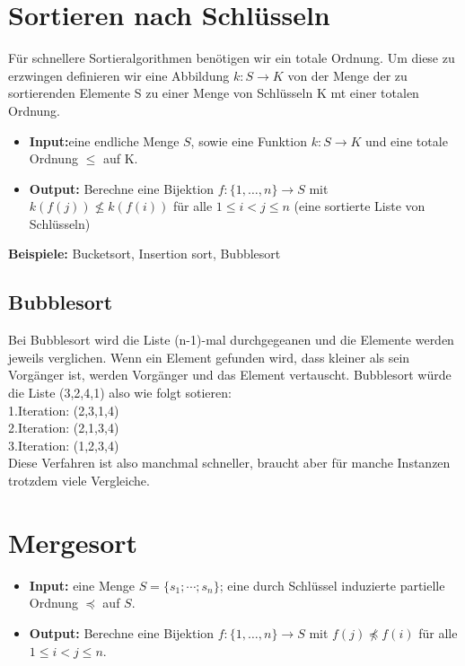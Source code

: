\documentclass{article}
\begin{document}
\section{Sortieren nach Schlüsseln}

Für schnellere Sortieralgorithmen benötigen wir ein totale Ordnung. Um diese zu erzwingen definieren wir eine Abbildung $k:S\rightarrow K$ von der Menge der zu sortierenden Elemente S zu einer Menge von Schlüsseln K mt einer totalen Ordnung.
\begin{itemize}\item\textbf{Input:}eine endliche Menge $S$, sowie eine Funktion $k:S\rightarrow K$ und eine totale Ordnung $\le$ auf K.
\item\textbf{Output:}
Berechne eine Bijektion $f \colon \{1,\dots,n\} \to S$ mit $k(f(j)) \not\le k(f(i))$ für alle $1\le i<j \le n$ (eine sortierte Liste von Schlüsseln)
\end{itemize}
\textbf{Beispiele:}
Bucketsort, Insertion sort, Bubblesort

\subsection{Bubblesort}

Bei Bubblesort wird die Liste (n-1)-mal durchgegeanen und die Elemente werden jeweils verglichen. Wenn ein Element gefunden wird, dass kleiner als sein Vorgänger ist, werden Vorgänger und das Element vertauscht.
Bubblesort würde die Liste (3,2,4,1) also wie folgt sotieren:\\
1.Iteration: (2,3,1,4) \\
2.Iteration: (2,1,3,4)\\
3.Iteration: (1,2,3,4)\\
Diese Verfahren ist also manchmal schneller, braucht aber für manche Instanzen trotzdem viele Vergleiche.

\section{Mergesort}

\begin{itemize}\item \textbf{Input:}
eine  Menge $S=\{s_1; \cdots ;s_n \}$; eine durch Schlüssel induzierte partielle Ordnung $\preceq$ auf $S$.\item\textbf{Output:}
Berechne eine Bijektion $f \colon \{1,\dots,n\} \to S$ mit $f(j) \not\preceq f(i)$ für alle $1\le i<j \le n$.
 \end{itemize}
 
\end{document}
